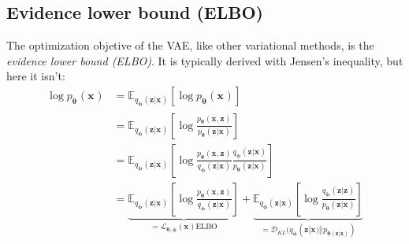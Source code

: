 \documentclass{article}
\begin{document}
\subsection{Evidence lower bound (ELBO)}
The optimization objetive of the VAE, like other variational methods,
is the \textit{evidence lower bound (ELBO)}.
It is typically derived with Jensen's inequality, but here it isn't:
\begin{align}
		\log p_{ \bm{\theta}_{} } (\bm{x}_{}) 
&= \mathbb{E}_{ q_{ \bm{\phi}_{} } (\bm{z}_{}|\bm{x}_{}) } \left[ \log p_{ \bm{\theta}_{} } (\bm{x}_{}) \right] \\
&= \mathbb{E}_{ q_{ \bm{\phi}_{} } (\bm{z}_{}|\bm{x}_{}) } \left[ \log 
\frac{p_{ \bm{\theta}_{} } (\bm{x}_{}, \bm{z}_{})}{p_{ \bm{\theta}_{} } (\bm{z}_{}| \bm{x}_{})} 
\right] \\
&= \mathbb{E}_{ q_{ \bm{\phi}_{} } (\bm{z}_{}|\bm{x}_{}) } \left[ \log 
\frac{p_{ \bm{\theta}_{} } (\bm{x}_{}, \bm{z}_{})}{q_{ \bm{\phi}_{} } (\bm{z}_{}| \bm{x}_{})} 
\frac{q_{ \bm{\phi}_{} } (\bm{z}_{}| \bm{x}_{})}{p_{ \bm{\theta}_{} } (\bm{z}_{}| \bm{x}_{})} 
\right] \\
&= 
\underbrace{\mathbb{E}_{ q_{ \bm{\phi}_{} } (\bm{z}_{}|\bm{x}_{}) } \left[ \log 
		\frac{p_{ \bm{\theta}_{} } (\bm{x}_{}, \bm{z}_{})}{q_{ \bm{\phi}_{} } (\bm{z}_{}| \bm{x}_{})} \right]}_{ 
= \mathcal{L}_{ \bm{\theta}_{}, \bm{\phi}_{}} (\bm{x}_{}) \text{ELBO} }
+
\underbrace{\mathbb{E}_{ q_{ \bm{\phi}_{} } (\bm{z}_{}|\bm{x}_{}) } \left[ \log 
		\frac{q_{ \bm{\phi}_{} } (\bm{z}_{}| \bm{z}_{})}{p_{ \bm{\theta}_{} } (\bm{z}_{}| \bm{x}_{})}\right] }_{ 
= \mathcal{D}_{KL} (q_{ \bm{\phi}_{} }(\bm{z}_{}|\bm{x}_{})||
p_{ \bm{\theta}_{} (\bm{z}_{}|\bm{x}_{})}) }
\end{align}
\end{document}
